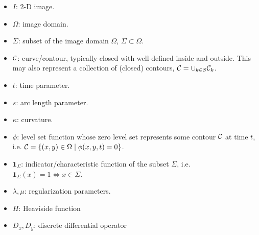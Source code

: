 \begin{itemize}
	\item $I$: 2-D image.
	
	\item $\Omega$: image domain.
	
	\item $\Sigma$: subset of the image domain $\Omega$, $\Sigma \subset \Omega$.
	
	\item $\mathcal{C}$: curve/contour, typically closed with well-defined inside and outside. This may also represent a collection of (closed) contours, $\mathcal{C} = \cup_{k \in S} \mathcal{C}_k$.
	
	\item $t$: time parameter. 
	
	\item $s$: arc length parameter.
	
	\item $\kappa$: curvature. 
	
	\item $\phi$: level set function whose zero level set represents some contour $\mathcal{C}$ at time $t$, i.e. $\mathcal{C} = \{(x,y) \in \Omega \mid \phi(x,y,t) = 0\}$. 
	
	\item $\mathbf{1}_\Sigma$: indicator/characteristic function of the subset $\Sigma$, i.e. $\mathbf{1}_\Sigma(x) = 1 \iff x \in \Sigma$.
	
	\item $\lambda, \mu$: regularization parameters.
	
	\item $H$: Heaviside function
	
	\item $D_x, D_y$: discrete differential operator
\end{itemize}